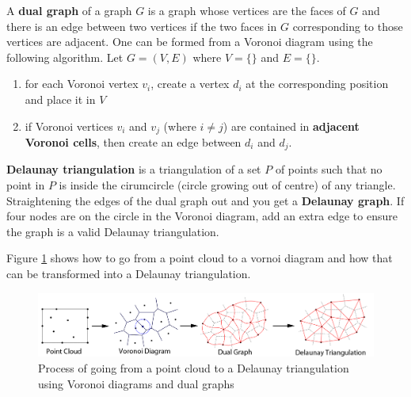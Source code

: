 \documentclass{article}
\begin{document}
A \textbf{dual graph} of a graph $G$ is a graph whose vertices are the faces of $G$ and there is an edge between two vertices if the two faces in $G$ corresponding to those vertices are adjacent. One can be formed from a Voronoi diagram using the following algorithm.
Let $G = (V, E)$ where $V = \lbrace \rbrace$ and $E = \lbrace \rbrace$.
\begin{enumerate}
	\item for each Voronoi vertex $v_i$, create a vertex $d_i$ at the corresponding position and place it in $V$
	\item if Voronoi vertices $v_i$ and $v_j$ (where $i \neq j$) are contained in \textbf{adjacent Voronoi cells}, then create an edge between $d_i$ and $d_j$.
\end{enumerate}

\textbf{Delaunay triangulation} is a triangulation of a set $P$ of points such that no point in $P$ is inside the cirumcircle (circle growing out of centre) of any triangle. Straightening the edges of the dual graph out and you get a \textbf{Delaunay graph}. If four nodes are on the  circle in the Voronoi diagram, add an extra edge to ensure the graph is a valid Delaunay triangulation.

Figure \ref{fig:vornoi-dual-delaunay} shows how to go from a point cloud to a vornoi diagram and how that can be transformed into a Delaunay triangulation.

\begin{figure}
	\centering
	\includegraphics[scale=0.35]{figures/mesh-triangulation-process.png}
	\caption{Process of going from a point cloud to a Delaunay triangulation using Voronoi diagrams and dual graphs}
	\label{fig:vornoi-dual-delaunay}
\end{figure}
\end{document}
